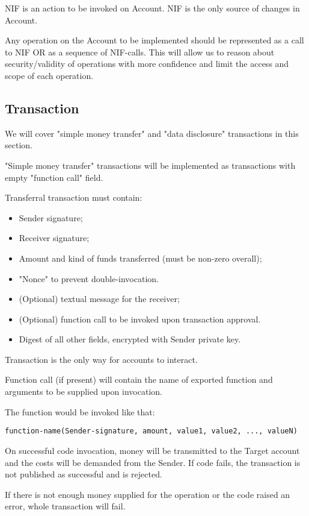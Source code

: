 NIF is an action to be invoked on Account.
NIF is the only source of changes in Account.

Any operation on the Account to be implemented should be represented as a call to NIF OR as a sequence of NIF-calls.
This will allow us to reason about security/validity of operations with more confidence and limit the access and scope of each operation.

\subsection{Transaction}

We will cover "simple money transfer" and "data disclosure" transactions in this section.

"Simple money transfer" transactions will be implemented as transactions with empty "function call" field.

Transferral transaction must contain:
\begin{itemize}
  \item Sender signature;
  \item Receiver signature;
  \item Amount and kind of funds transferred (must be non-zero overall);
  \item "Nonce" to prevent double-invocation.
  \item (Optional) textual message for the receiver;
  \item (Optional) function call to be invoked upon transaction approval.
  \item Digest of all other fields, encrypted with Sender private key.
\end{itemize}

Transaction is the only way for accounts to interact.

Function call (if present) will contain the name of exported function and arguments to be supplied upon invocation.

The function would be invoked like that:

\begin{verbatim}
function-name(Sender-signature, amount, value1, value2, ..., valueN)
\end{verbatim}

On successful code invocation, money will be transmitted to the Target account and the costs will be demanded from the Sender.
If code fails, the transaction is not published as successful and is rejected.

If there is not enough money supplied for the operation or the code raised an error, whole transaction will fail.

